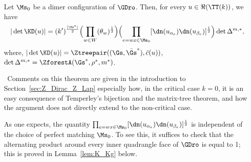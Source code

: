 \documentclass[a4paper,twoside,11pt]{article}
\begin{document}
\begin{thm}\label{thm:det}
Let $\Ms_0$ be a dimer configuration of $\GDro$. 
Then, for every $u\in\Re(\TT(k))$, we have
\begin{equation}\label{equ:thm_det}
|\det\KD(u)|=
(k')^{\frac{|\Vs^*|}{2}}\Bigl(\prod_{w\in W}\sc(\theta_w)^\frac{1}{2}\Bigr)
\Bigl(\prod_{e=wx\in\Ms_0} [\dn(u_{\alpha_e})\dn(u_{\beta_e})]^{\frac{1}{2}}  \Bigr)
\det \Delta^{m,*},
\end{equation}
where, $|\det\KD(u)|=\Ztreepair((\Gs,\bar{\Gs}^*),\tilde{c}(u))$, $\det \Delta^{m,*}=\ZforestA(\Gs^*,\rho^*,m^*)$.
\end{thm}

\begin{rem}\label{rem:partition_funciont_KD_Lap}$\,$
Comments on this theorem are given in the introduction to Section~\ref{sec:Z_Dirac_Z_Lap} especially how, in the critical case $k=0$, it is an 
easy consequence of Temperley's bijection and the matrix-tree theorem, and how the argument does not directly extend to the non-critical case.

As one expects, the quantity $\prod_{e=wx\in\Ms_0} [\dn(u_{\alpha_e})\dn(u_{\beta_e})]^{\frac{1}{2}}$
is independent of the choice of perfect matching $\Ms_0$. To see this, it suffices to check that the alternating product around every inner quadrangle face of $\GDro$
is equal to 1; this is proved in Lemma~\ref{lem:K_Kg} below.


\end{rem}
\end{document}

